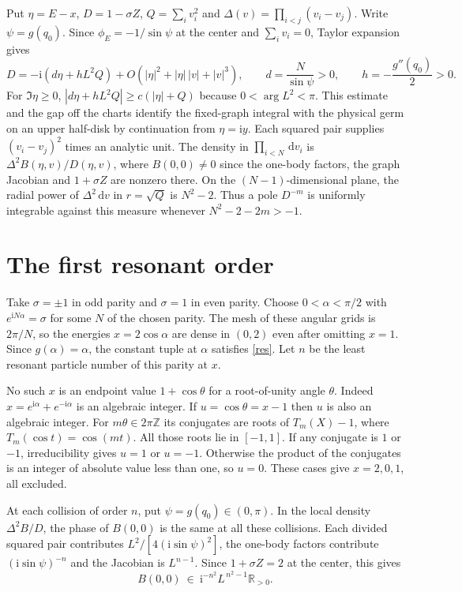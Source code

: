 \documentclass[11pt]{article}
\newcommand{\ii}{\mathrm i}
\newcommand{\dd}{\,\mathrm d}
\newcommand{\R}{\mathbb R}
\newcommand{\Z}{\mathbb Z}
\begin{document}
Put $\eta=E-x$, $D=1-\sigma Z$, $Q=\sum_i v_i^2$ and
$\Delta(v)=\prod_{i<j}(v_i-v_j)$. Write $\psi=g(q_0)$.
Since $\phi_E=-1/\sin\psi$ at the center and $\sum_i v_i=0$,
Taylor expansion gives
\begin{equation}\label{expansion}
 D=-\ii(d\eta+hL^2 Q)+O(|\eta|^2+|\eta|\,|v|+|v|^3),\qquad
 d=\frac{N}{\sin\psi}>0,\qquad h=-\frac{g''(q_0)}2>0 .
\end{equation}
For $\Im\eta\ge0$, $|d\eta+hL^2Q|\ge c(|\eta|+Q)$ because
$0<\arg L^2<\pi$. This estimate and the gap off the charts identify
the fixed-graph integral with the physical germ on an upper half-disk
by continuation from $\eta=\ii y$. Each squared pair supplies
$(v_i-v_j)^2$ times an analytic unit. The density in
$\prod_{i<N}\dd v_i$ is $\Delta^2 B(\eta,v)/D(\eta,v)$, where
$B(0,0)\ne0$ since the one-body factors, the graph Jacobian and
$1+\sigma Z$ are nonzero there. On the $(N-1)$-dimensional plane,
the radial power of $\Delta^2\dd v$ in $r=\sqrt Q$ is $N^2-2$.
Thus a pole $D^{-m}$ is uniformly integrable against this measure
whenever $N^2-2-2m>-1$.

\section{The first resonant order}

Take $\sigma=\pm1$ in odd parity and $\sigma=1$ in even parity.
Choose $0<\alpha<\pi/2$ with $e^{\ii N\alpha}=\sigma$ for some $N$
of the chosen parity. The mesh of these angular grids is $2\pi/N$,
so the energies $x=2\cos\alpha$ are dense in $(0,2)$ even after
omitting $x=1$. Since $g(\alpha)=\alpha$, the constant tuple at
$\alpha$ satisfies \eqref{res}. Let $n$ be the least resonant
particle number of this parity at $x$.

No such $x$ is an endpoint value $1+\cos\theta$ for a root-of-unity
angle $\theta$. Indeed $x=e^{\ii\alpha}+e^{-\ii\alpha}$ is an algebraic
integer. If $u=\cos\theta=x-1$ then $u$ is also an algebraic integer.
For $m\theta\in2\pi\Z$ its conjugates are roots of $T_m(X)-1$, where
$T_m(\cos t)=\cos(mt)$. All those roots lie in $[-1,1]$.
If any conjugate is $1$ or $-1$, irreducibility gives $u=1$ or
$u=-1$. Otherwise the product of the conjugates is an integer of
absolute value less than one, so $u=0$. These cases give $x=2,0,1$,
all excluded.

At each collision of order $n$, put $\psi=g(q_0)\in(0,\pi)$.
In the local density $\Delta^2 B/D$, the phase of $B(0,0)$ is the same
at all these collisions. Each divided
squared pair contributes $L^2/[4(\ii\sin\psi)^2]$, the one-body
factors contribute $(\ii\sin\psi)^{-n}$ and the Jacobian is
$L^{n-1}$. Since $1+\sigma Z=2$ at the center, this gives
\[
 B(0,0)\ \in\ \ii^{-n^2}L^{\,n^2-1}\R_{>0}.
\]
\end{document}
